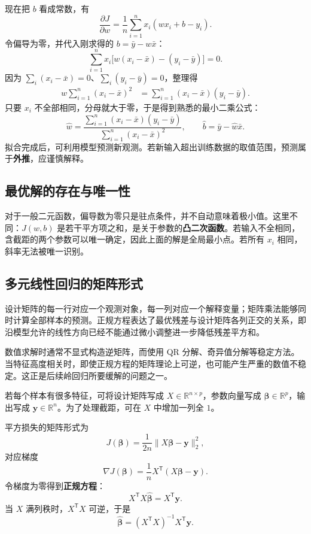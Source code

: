 现在把 $b$ 看成常数，有
\begin{equation}\label{eq:partial-w}
\frac{\partial J}{\partial w}
=\frac1n\sum_{i=1}^{n}x_i(wx_i+b-y_i).
\end{equation}
令偏导为零，并代入刚求得的 $b=\bar y-w\bar x$：
\[
\sum_{i=1}^{n}x_i\bigl[w(x_i-\bar x)-(y_i-\bar y)\bigr]=0.
\]
因为 $\sum_i(x_i-\bar x)=0$、$\sum_i(y_i-\bar y)=0$，整理得
\begin{align*}
w\sum_{i=1}^{n}(x_i-\bar x)^2
&=\sum_{i=1}^{n}(x_i-\bar x)(y_i-\bar y).
\end{align*}
只要 $x_i$ 不全部相同，分母就大于零，于是得到熟悉的最小二乘公式：
\begin{equation}\label{eq:slope-ls}
\boxed{
\hat w=\frac{\sum_{i=1}^{n}(x_i-\bar x)(y_i-\bar y)}
{\sum_{i=1}^{n}(x_i-\bar x)^2},\qquad
\hat b=\bar y-\hat w\bar x.
}
\end{equation}
拟合完成后，可利用模型预测新观测。若新输入超出训练数据的取值范围，预测属于\textbf{外推}，应谨慎解释。

\subsection{最优解的存在与唯一性}

对于一般二元函数，偏导数为零只是驻点条件，并不自动意味着极小值。这里不同：$J(w,b)$ 是若干平方项之和，是关于参数的\textbf{凸二次函数}。若输入不全相同，含截距的两个参数可以唯一确定，因此上面的解是全局最小点。若所有 $x_i$ 相同，斜率无法被唯一识别。

\subsection{多元线性回归的矩阵形式}

设计矩阵的每一行对应一个观测对象，每一列对应一个解释变量；矩阵乘法能够同时计算全部样本的预测。正规方程表达了最优残差与设计矩阵各列正交的关系，即沿模型允许的线性方向已经不能通过微小调整进一步降低残差平方和。

数值求解时通常不显式构造逆矩阵，而使用 QR 分解、奇异值分解等稳定方法。当特征高度相关时，即使正规方程的矩阵理论上可逆，也可能产生严重的数值不稳定。这正是后续岭回归所要缓解的问题之一。

若每个样本有很多特征，可将设计矩阵写成 $X\in\mathbb R^{n\times p}$，参数向量写成 $\boldsymbol\beta\in\mathbb R^p$，输出写成 $\boldsymbol y\in\mathbb R^n$。为了处理截距，可在 $X$ 中增加一列全 $1$。

平方损失的矩阵形式为
\[
J(\boldsymbol\beta)=\frac1{2n}\lVert X\boldsymbol\beta-\boldsymbol y\rVert_2^2,
\]
对应梯度
\begin{equation}\label{eq:ls-gradient}
\nabla J(\boldsymbol\beta)=\frac1nX^{\mathsf T}(X\boldsymbol\beta-\boldsymbol y).
\end{equation}
令梯度为零得到\textbf{正规方程}：
\begin{equation}\label{eq:normal-equation}
X^{\mathsf T}X\hat{\boldsymbol\beta}=X^{\mathsf T}\boldsymbol y.
\end{equation}
当 $X$ 满列秩时，$X^{\mathsf T}X$ 可逆，于是
\begin{equation}\label{eq:ols-solution}
\hat{\boldsymbol\beta}=(X^{\mathsf T}X)^{-1}X^{\mathsf T}\boldsymbol y.
\end{equation}
